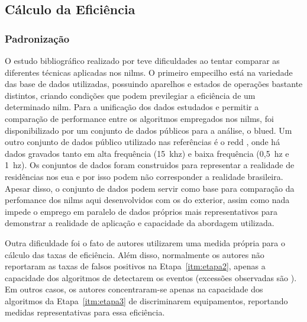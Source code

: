 \subsection{Cálculo da Eficiência}
\label{ssec:nilm_eff_calc}

\subsubsection{Padronização}
\label{top:nilm_padrao}

O estudo bibliográfico realizado por \cite{nilm_zeifman_review_2011}
teve dificuldades ao tentar comparar as diferentes técnicas aplicadas
nos \glspl{nilm}. O primeiro empecilho está na variedade das base
de dados utilizadas, possuindo aparelhos e estados de operações
bastante distintos, criando condições que podem previlegiar a
eficiência de um determinado \gls{nilm}. Para a unificação dos dados
estudados e permitir a comparação de performance entre os algoritmos
empregados nos \glspl{nilm}, foi disponibilizado por
\cite{nilm_dataset_blued_2012} um conjunto de dados públicos para
a análise, o \acs{blued}. Um outro conjunto de dados público
utilizado nas referências é o \acs{redd}
\cite{nilm_dataset_redd_2011}, onde há dados gravados tanto em alta
frequência (15~k\acs{hz}) e baixa frequência (0,5~\acs{hz} e
1~\acs{hz}). Os conjuntos de dados foram construidos para
representar a realidade de residências nos \gls{eua} e por isso podem
não corresponder a realidade brasileira. Apesar disso, o conjunto
de dados podem servir como base para comparação da perfomance dos
\glspl{nilm} aqui desenvolvidos com os do exterior, assim como nada
impede o emprego em paralelo de dados próprios mais representativos
para demonstrar a realidade de aplicação e capacidade da abordagem
utilizada.

Outra dificuldade foi o fato de autores utilizarem uma
medida própria para o cálculo das taxas de eficiência.  Além disso,
normalmente os autores não reportaram as taxas de falsos positivos na
Etapa~\ref{itm:etapa2}, apenas a capacidade dos algoritmos de
detectarem os eventos (excessões observadas são
\cite{nilm_marceau_16ssamp_improved_1999_18,nilm_liang_pt2_2010_40}).
Em outros casos, os autores concentraram-se apenas na capacidade dos
algoritmos da Etapa~\ref{itm:etapa3} de discriminarem equipamentos,
reportando medidas representativas para essa eficiência.

